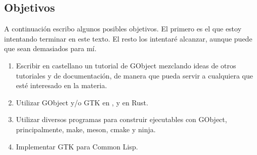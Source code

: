 \subsection{Objetivos} \label{subsec:objetivos}
A continuación escribo algunos posibles objetivos. El primero es el que estoy
intentando terminar en este texto. El resto los intentaré alcanzar, aunque puede
que sean demasiados para mí.
\begin{enumerate}
  \tightlist
\item Escribir en castellano un tutorial de \textsf{GObject} mezclando ideas de otros
  tutoriales y de documentación, de manera que pueda servir a cualquiera que esté
  interesado en la materia.
\item Utilizar \textsf{GObject} y/o \textsf{GTK} en ,   y en
  \textsf{Rust}.
\item Utilizar diversos programas para construir ejecutables con \textsf{GObject},
  principalmente, \textsf{make}, \textsf{meson}, \textsf{cmake} y \textsf{ninja}.
\item Implementar GTK para Common Lisp.
\end{enumerate}

